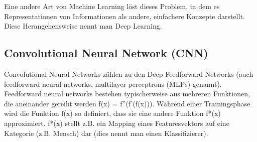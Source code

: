 Eine andere Art von Machine Learning löst dieses Problem, in dem es Representationen von Informationen als andere, einfachere Konzepte darstellt. Diese Herangehensweise nennt man Deep Learning. \cite{good}



\subsection{Convolutional Neural Network (CNN)}
Convolutional Neural Networks zählen zu den Deep Feedforward Networks (auch feedforward neural networks, multilayer perceptrons (MLPs) genannt). Feedforward neural networks bestehen typischerweise aus mehreren Funktionen, die aneinander gereiht werden f(x) = f''(f'(f(x))). Während einer Trainingsphase wird die Funktion f(x) so definiert, dass sie eine andere Funktion f*(x) approximiert. f*(x) stellt z.B. ein Mapping eines Featuresvektors auf eine Kategorie (z.B. Mensch) dar (dies nennt man einen Klassifizierer). \cite{good}

